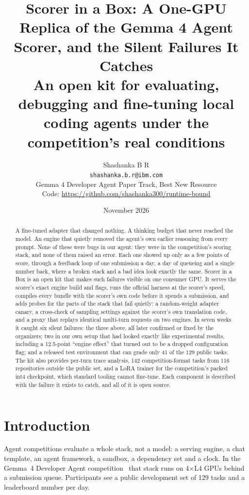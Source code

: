 \documentclass[11pt]{article}
\title{\textbf{Scorer in a Box: A One-GPU Replica of the Gemma 4 Agent Scorer, and the Silent Failures It Catches}\\[8pt]
\large An open kit for evaluating, debugging and fine-tuning local coding agents under the competition's real conditions}
\author{Shashanka B R\\\small\texttt{shashanka.b.r@ibm.com}\\[4pt]\small Gemma 4 Developer Agent Paper Track, Best New Resource\\\small Code: \url{https://github.com/shashanka300/runtime-bound}}
\date{November 2026}
\begin{document}
\maketitle

\begin{abstract}
A fine-tuned adapter that changed nothing. A thinking budget that never reached the model. An engine that quietly removed the agent's own earlier reasoning from every prompt. None of these were bugs in our agent: they were in the competition's scoring stack, and none of them raised an error. Each one showed up only as a few points of score, through a feedback loop of one submission a day, a day of queueing and a single number back, where a broken stack and a bad idea look exactly the same. Scorer in a Box is an open kit that makes such failures visible on one consumer GPU. It serves the scorer's exact engine build and flags, runs the official harness at the scorer's speed, compiles every bundle with the scorer's own code before it spends a submission, and adds probes for the parts of the stack that fail quietly: a random-weight adapter canary, a cross-check of sampling settings against the scorer's own translation code, and a proxy that replays identical multi-turn requests on two engines. In seven weeks it caught six silent failures: the three above, all later confirmed or fixed by the organizers; two in our own setup that had looked exactly like experimental results, including a 12.5-point ``engine effect'' that turned out to be a dropped configuration flag; and a released test environment that can grade only 41 of the 129 public tasks. The kit also provides per-turn trace analysis, 142 competition-format tasks from 116 repositories outside the public set, and a LoRA trainer for the competition's packed int4 checkpoint, which standard tooling cannot fine-tune. Each component is described with the failure it exists to catch, and all of it is open source.
\end{abstract}

\section{Introduction}
Agent competitions evaluate a whole stack, not a model: a serving engine, a chat template, an agent framework, a sandbox, a dependency set and a clock. In the Gemma~4 Developer Agent competition~\citep{gemma4paper2026} that stack runs on 4$\times$L4 GPUs behind a submission queue. Participants see a public development set of 129 tasks and a leaderboard number per day.
\end{document}
